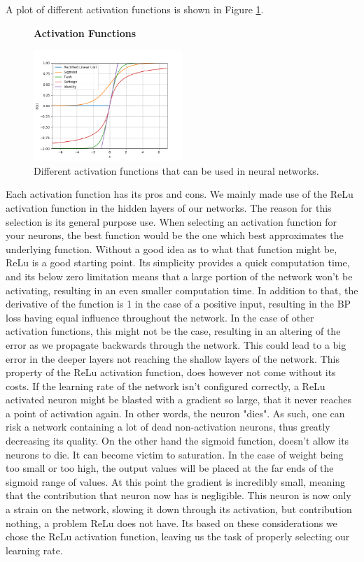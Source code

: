 A plot of different activation functions is shown in Figure
\ref{fig:activation_functions}.

\begin{figure}
    \centering
    \textbf{Activation Functions}\par\medskip
    \includegraphics[width=0.5\textwidth]{./pictures/method/activation_functions.png}
    \caption{Different activation functions that can be used in neural
        networks.}
    \label{fig:activation_functions}
\end{figure}

Each activation function has its pros and cons. We mainly made use of the
\gls{ReLu} activation function in the hidden layers of our networks. The
reason for this selection is its general purpose use. When selecting an
activation function for your neurons, the best function would be the one which
best approximates the underlying function. Without a good idea as to what
that function might be, \gls{ReLu} is a good starting point. Its simplicity
provides a quick computation time, and its below zero limitation means that a
large portion of the network won't be activating, resulting in an even smaller
computation time. In addition to that, the derivative of the function is 1
in the case of a positive input, resulting in the \gls{BP} loss having equal
influence throughout the network. In the case of other activation functions,
this might not be the case, resulting in an altering of the error as we
propagate backwards through the network. This could lead to a big error in the
deeper layers not reaching the shallow layers of the network. This property of
the \gls{ReLu} activation function, does however not come without its costs.
If the learning rate of the network isn't configured correctly, a \gls{ReLu}
activated neuron might be blasted with a gradient so large, that it never
reaches a point of activation again. In other words, the neuron "dies". As
such, one can risk a network containing a lot of dead non-activation neurons,
thus greatly decreasing its quality. On the other hand the sigmoid function,
doesn't allow its neurons to die. It can become victim to saturation. In
the case of weight being too small or too high, the output values will be
placed at the far ends of the sigmoid range of values. At this point the
gradient is incredibly small, meaning that the contribution that neuron now has
is negligible. This neuron is now only a strain on the network, slowing it
down through its activation, but contribution nothing, a problem \gls{ReLu}
does not have. Its based on these considerations we chose the \gls{ReLu}
activation function, leaving us the task of properly selecting our learning
rate.\cite{JiYan}\cite{AndrejKarpathy}\cite{AvinashSharmaV}

